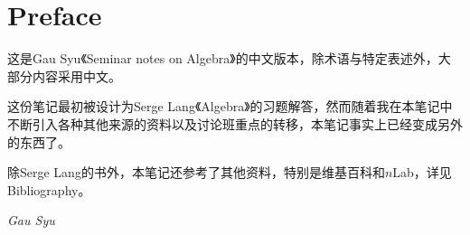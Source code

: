 \chapter*{\giant\Edward Preface}

这是Gau Syu《Seminar notes on Algebra》的中文版本，除术语与特定表述外，大部分内容采用中文。

这份笔记最初被设计为Serge Lang《Algebra》\cite{lang2002algebra}的习题解答，然而随着我在本笔记中不断引入各种其他来源的资料以及讨论班重点的转移，本笔记事实上已经变成另外的东西了。

除Serge Lang的书外，本笔记还参考了其他资料，特别是维基百科和$n$Lab，详见Bibliography。

\begin{flushright}
  \emph{Gau Syu}
\end{flushright}
